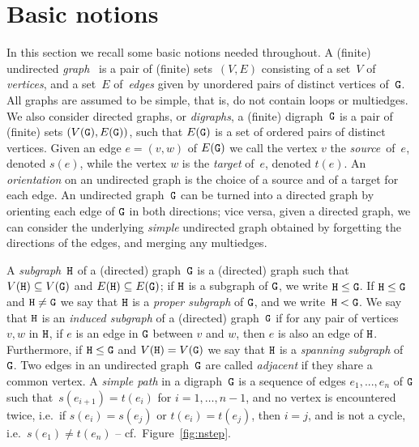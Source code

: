 \documentclass{amsart}
\begin{document}
\section{Basic notions}
In this section we recall some basic notions  needed {throughout}. A (finite) undirected \emph{graph} \tG~is a pair of (finite) sets~$(V,E)$ consisting of a set~$V$ of \emph{vertices}, and a set~$E$ of~\emph{edges} given by unordered pairs of distinct vertices of~${\tt G}$. All graphs are assumed to be simple{, that is, do not contain loops or multiedges}.
We also consider directed graphs, or \emph{digraphs}, a (finite) digraph~${\tt G}$ is a pair of (finite) sets $(V({\tt G}),E({\tt G}))$, such that $E({\tt G})$ is a set of ordered pairs of distinct vertices.
Given an edge $e = (v, w)$ of $E({\tt G})$ we call the vertex $v$ the \emph{source}~of~$e$, denoted $s(e)$, while the vertex $w$ is the \emph{target} of~$e$, denoted $t(e)$.
An \emph{orientation} on an undirected graph is the choice of a source and of a target for each edge. 
An undirected graph~${\tt G}$ can be turned into a directed graph by orienting each edge of ${\tt G}$ in both directions; vice versa, given a directed graph, we can consider the underlying \emph{simple} undirected graph obtained by forgetting the directions of the edges, and merging any multiedges.

A \emph{subgraph}~${\tt H}$ of a (directed) graph~${\tt G}$ is a (directed) graph such that $V({\tt H})\subseteq V({\tt G})$ and $E({\tt H})\subseteq E({\tt G})$; if ${\tt H}$ is a subgraph of ${\tt G}$, we  write ${\tt H} \leq {\tt G}$.
If ${\tt H} \leq {\tt G}$ and ${\tt H}\neq {\tt G}$ we say that ${\tt H}$ is a \emph{proper subgraph} of ${\tt G}$, and we write~${\tt H}< {\tt G}$. We say that ${\tt H}$ is an \emph{induced subgraph}  of a (directed) graph~${\tt G}$ if for any pair of vertices $v,w$ in ${\tt H}$, if $e$ is an edge in ${\tt G}$ between $v$ and $w$, then $e$ is also an edge of ${\tt H}$.  Furthermore, if ${\tt H}\leq {\tt G}$ and $V({\tt H}) = V({\tt G})$ we  say that ${\tt H}$ is a \emph{spanning subgraph} of~${\tt G}$. Two edges in an undirected graph~${\tt G}$ are called \emph{adjacent} if they share a common vertex.  
A  \emph{simple path} in a digraph~${\tt G}$  is a sequence of edges $e_1,...,e_n$ of ${\tt G}$ such that~$s(e_{i+1})=t(e_i)$ for $i=1,\dots,n-1$, and no vertex is encountered twice, i.e.~if $s(e_i) = s(e_j)$ or $t(e_i) = t(e_j)$, then $i=j$, and is not a cycle, i.e.~$s(e_1)\neq t(e_n)$ -- cf.~Figure~\ref{fig:nstep}. 


		
\end{document}
